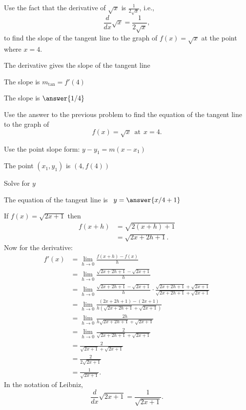 \documentclass{ximera}
\begin{document}
\begin{problem} %
Use the fact that the derivative of $\sqrt{x}$ is $\frac{1}{2\sqrt{x}}$,
i.e., 
\[
\frac{d}{dx}\sqrt{x} = \frac{1}{2\sqrt{x}},
\]
to find the slope of the tangent line to the graph of 
$f(x) = \sqrt{x}$ at the point where $x = 4$.\\
\begin{hint}
The derivative gives the slope of the tangent line
\end{hint}
\begin{hint}
The slope is $m_{\text{tan}} = f'(4)$
\end{hint}
The slope is $\answer{1/4}$
\end{problem}




\begin{problem} %
Use the answer to the previous problem to find the equation of the tangent line to the graph of 
\[
f(x) = \sqrt{x} \ \ \text{at} \ \ x=4.
\]
\begin{hint}
Use the point slope form: $y-y_1 = m(x-x_1)$
\end{hint}
\begin{hint}
The point $(x_1,y_1)$ is $(4, f(4))$
\end{hint}
\begin{hint}
Solve for $y$
\end{hint}
The equation of the tangent line is \ $y = \answer{x/4 +1}$
\end{problem}


\begin{example}[example 5]
If $f(x) = \sqrt {2x+1}$ then
\begin{align*}
f(x+h) &= \sqrt{2(x+h)+1} \\
       &= \sqrt{2x +2h+1}.			
\end{align*}
Now for the derivative:
\begin{align*}
f'(x) &= \lim_{h \to 0} \frac{f(x+h)-f(x)}{h}\\[5pt]
&= \lim_{h \to 0} \frac{\sqrt{2x+2h+1}- \sqrt{2x+1}}{h}\\[5pt]
&= \lim_{h \to 0} \frac{\sqrt{2x+2h+1}- \sqrt{2x+1}}{h} \cdot
\frac{\sqrt{2x+2h+1}+ \sqrt{2x+1}}{\sqrt{2x+2h+1}+ \sqrt{2x+1}} \\[5pt]
&= \lim_{h \to 0} \frac{(2x+2h+1) - (2x+1)}{h(\sqrt{2x+2h+1}+ \sqrt{2x+1})}\\[5pt]
&= \lim_{h \to 0} \frac{2h}{h\sqrt{2x+2h+1}+ \sqrt{2x+1}}\\[5pt]
&= \lim_{h \to 0} \frac{2}{\sqrt{2x+2h+1}+ \sqrt{2x+1}}\\[5pt]
&=  \frac{2}{\sqrt{2x+1}+ \sqrt{2x+1}}\\[5pt]
&=  \frac{2}{2\sqrt{2x+1}}\\[5pt]
&=  \displaystyle{\frac{1}{\sqrt{2x+1}}}.
\end{align*}
In the notation of Leibniz, 
\[
\frac{d}{dx}\sqrt{2x+1}= \frac{1}{\sqrt{2x+1}}.
\]

\end{example}
\end{document}
